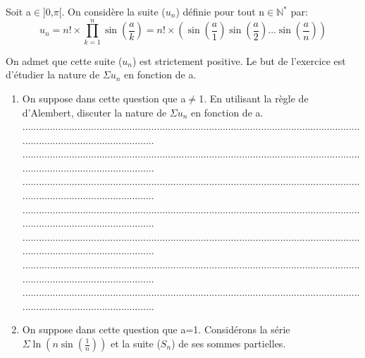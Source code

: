 \documentclass{article}
\begin{document}
\begin{footnotesize}
Soit a$\in$]0,$\pi$[. On considère la suite ($u_{n}$) définie pour tout n$\in \mathbb{N^{*}}$ par:
\[ u_{n} = n! \times \prod_{k=1}^{n} \sin\left(\frac{a}{k}\right) = n! \times \left(\sin\left(\frac{a}{1}\right)\sin\left(\frac{a}{2}\right)...\sin\left(\frac{a}{n}\right)\right) \]

\noindent On admet que cette suite ($u_{n}$) est strictement positive. Le but de l'exercice est d'étudier la nature de $\Sigma u_{n}$ en fonction de a.
\begin{enumerate}
    \item On suppose dans cette question que a$\neq$1. En utilisant la règle de d'Alembert, discuter la nature de $\Sigma u_{n}$ en fonction de a.\newline\newline
    ...........................................................................................................................................................................\newline
    ...........................................................................................................................................................................\newline
    ...........................................................................................................................................................................\newline
    ...........................................................................................................................................................................\newline
    ...........................................................................................................................................................................\newline
    ...........................................................................................................................................................................\newline
    ...........................................................................................................................................................................\newline\newline
    \item On suppose dans cette question que a=1. Considérons la série $\Sigma\ln(n\sin(\frac{1}{n}))$ et la suite ($S_{n}$) de ses sommes partielles.

\end{enumerate}
\end{footnotesize}
\end{document}
